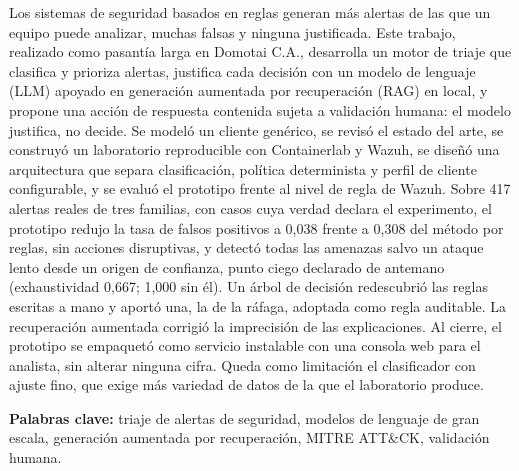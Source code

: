 

Los sistemas de seguridad basados en reglas generan más alertas de las que un equipo puede
analizar, muchas falsas y ninguna justificada. Este trabajo, realizado como pasantía larga en
Domotai C.A., desarrolla un motor de triaje que clasifica y prioriza alertas, justifica cada
decisión con un modelo de lenguaje (LLM) apoyado en generación aumentada por recuperación (RAG)
en local, y propone una acción de respuesta contenida sujeta a validación
humana: el modelo justifica, no decide. Se modeló un cliente genérico, se revisó el estado del arte, se construyó un
laboratorio reproducible con Containerlab y Wazuh, se diseñó una arquitectura que separa
clasificación, política determinista y perfil de cliente configurable, y se evaluó el prototipo
frente al nivel de regla de Wazuh. Sobre 417 alertas reales de tres familias,
con casos cuya verdad declara el experimento, el prototipo redujo la tasa de falsos positivos a
0,038 frente a 0,308 del método por reglas, sin acciones disruptivas, y detectó todas las amenazas
salvo un ataque lento desde un origen de confianza, punto ciego declarado de antemano
(exhaustividad 0,667; 1,000 sin él). Un árbol de decisión redescubrió las reglas escritas a mano
y aportó una, la de la ráfaga, adoptada como regla auditable. La recuperación aumentada corrigió
la imprecisión de las explicaciones. Al cierre, el prototipo se empaquetó como servicio instalable
con una consola web para el analista, sin alterar ninguna cifra. Queda como limitación el clasificador con ajuste fino, que
exige más variedad de datos de la que el laboratorio produce.
\vspace{1.5\baselineskip}

\noindent\textbf{Palabras clave:} triaje de alertas de seguridad, modelos de lenguaje de gran
escala, generación aumentada por recuperación, MITRE ATT\&CK, validación humana.
